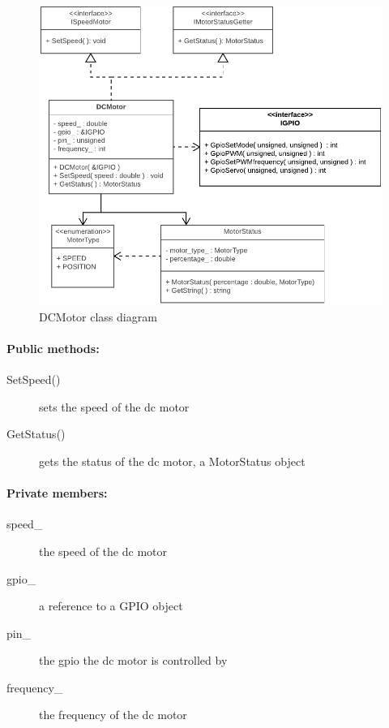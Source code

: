 \begin{figure}[H]
\centering
\includegraphics[width=1\linewidth]{Images/Design/DCMotor_class_diagram}
\caption{DCMotor class diagram}
\label{fig:dcmotor}
\end{figure}

\paragraph{Public methods:}
\begin{adjustwidth}{2.5em}{0pt}\begin{description}
		\item [SetSpeed()] sets the speed of the dc motor
		\item [GetStatus()] gets the status of the dc motor, a MotorStatus object
\end{description}\end{adjustwidth}

\paragraph{Private members:}
\begin{adjustwidth}{2.5em}{0pt}\begin{description}
		\item [speed_] the speed of the dc motor
		\item [gpio_] a reference to a GPIO object
		\item [pin_] the gpio the dc motor is controlled by
		\item [frequency_] the frequency of the dc motor
\end{description}\end{adjustwidth}

